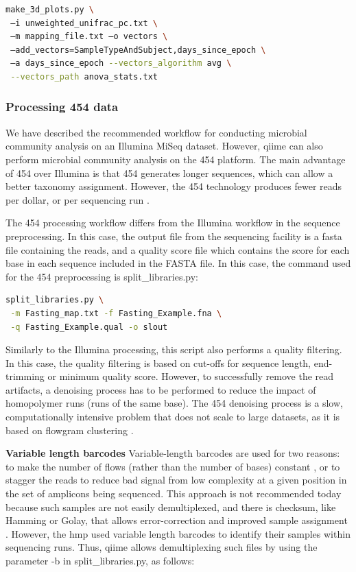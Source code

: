 \begin{lstlisting}[language=bash]
make_3d_plots.py \
 –i unweighted_unifrac_pc.txt \
 –m mapping_file.txt –o vectors \
 –add_vectors=SampleTypeAndSubject,days_since_epoch \
 –a days_since_epoch --vectors_algorithm avg \
 --vectors_path anova_stats.txt
\end{lstlisting}

\subsubsection{Processing 454 data}

We have described the recommended workflow for conducting microbial community analysis on an
Illumina MiSeq dataset. However, \gls{qiime} can also perform microbial community analysis on the
454 platform. The main advantage of 454 over Illumina is that 454 generates longer sequences,
which can allow a better taxonomy assignment. However, the 454 technology produces fewer reads per
dollar, or per sequencing run \cite{Kuczynski2011}.

The 454 processing workflow differs from the Illumina workflow in the sequence preprocessing.
In this case, the output file from the sequencing facility is a fasta file containing the reads,
and a quality score file which contains the score for each base in each sequence included in the FASTA file.
In this case, the command used for the 454 preprocessing is split\_libraries.py:

\begin{lstlisting}[language=bash]
split_libraries.py \
 -m Fasting_map.txt -f Fasting_Example.fna \
 -q Fasting_Example.qual -o slout
\end{lstlisting}

Similarly to the Illumina processing, this script also performs a quality filtering.
In this case, the quality filtering is based on cut-offs for sequence length, end-trimming
or minimum quality score. However, to successfully remove the read artifacts, a
denoising process has to be performed \cite{Reeder2010} to reduce the impact of homopolymer
runs (runs of the same base). The 454 denoising process is a slow, computationally intensive
problem that does not scale to large datasets, as it is based on flowgram clustering \cite{Quince2011}.

\textbf{Variable length barcodes} Variable-length barcodes are used for two reasons:
to make the number of flows (rather than the number of bases) constant \cite{Frank2009},
or to stagger the reads to reduce bad signal from low complexity at a given position in
the set of amplicons being sequenced. This approach is not recommended today because such
samples are not easily demultiplexed, and there is checksum, like Hamming or Golay, that
allows error-correction and improved sample assignment \cite{Hamady2008}. However,
the \gls{hmp} used variable length barcodes to identify their samples within sequencing runs.
Thus, \gls{qiime} allows demultiplexing such files by using the parameter -b in split\_libraries.py, as follows:

